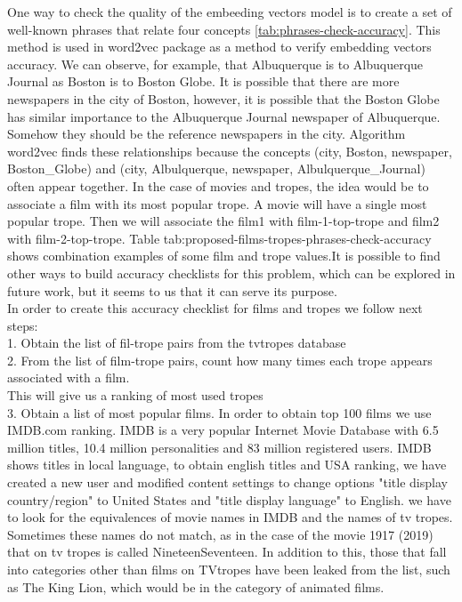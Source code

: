 \documentclass[letterpaper]{article}
\begin{document}
	 One way to check the quality of the embeeding vectors model is to create a set of 
	 well-known phrases that relate four concepts \ref{tab:phrases-check-accuracy}. This method is used in word2vec package \cite{mikolov2013} as a method to verify 
	 embedding vectors accuracy. We can observe, for example, that Albuquerque is to Albuquerque Journal
	  as Boston is to Boston Globe. It is possible that there are more newspapers in the city of Boston, however, it is possible that the Boston Globe has similar importance to the Albuquerque Journal newspaper of Albuquerque. Somehow they should be the reference newspapers in the city. Algorithm word2vec finds these relationships because the concepts (city, Boston, newspaper, Boston\_Globe) and (city, Albulquerque, newspaper, Albulquerque\_Journal) often appear together. 
	  In the case of movies and tropes, the idea would be to associate a film with its most popular trope. A movie will have a single most popular trope. 
	  Then we will associate the film1 with film-1-top-trope and film2 with film-2-top-trope. Table tab:proposed-films-tropes-phrases-check-accuracy shows combination examples of some film and trope values.It is possible to find other ways to build accuracy checklists for this problem, which can be explored in future work,
	   but it seems to us that it can serve its purpose.\\
	  
	  In order to create this accuracy checklist for films and tropes we follow next steps:\\
	  1. Obtain the list of fil-trope pairs from the tvtropes database\\
	  2. From the list of film-trope pairs, count how many times each trope appears associated with a film.\\ This will give us a ranking of most used tropes\\
	  3. Obtain a list of most  popular films.
	     In order to obtain top 100 films we use IMDB.com ranking. IMDB is a very popular Internet Movie Database with 6.5 million titles, 10.4 million personalities and 83 million registered users. IMDB shows titles in local language, to obtain english titles and USA ranking, we have created a new user and modified content settings to change options "title display country/region" to United States and "title display language" to English. we have to look for the 
	     equivalences of movie names in IMDB and the names of tv tropes. Sometimes these names do not match, as in the 
	     case of the movie 1917 (2019) that on tv tropes is called NineteenSeventeen. In addition to this, those that fall into categories other than films on TVtropes have been leaked from the list, such as The King Lion, which would be in the category of animated films.
	     
\end{document}
